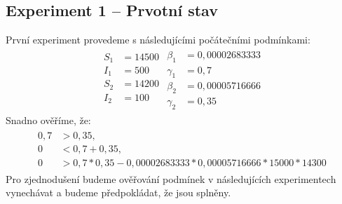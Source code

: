 \documentclass{article}
\begin{document}
\subsection{Experiment 1 -- Prvotní stav}
První experiment provedeme s následujícími počátečními podmínkami:
\begin{align}
\begin{split}
    S_1&=14500\\
    I_1&=500\\
    S_2&=14200\\
    I_2&=100\\
\end{split}
\begin{split}
    \beta_1&=0,00002683333\\
    \gamma_1&=0,7\\
    \beta_2&=0,00005716666\\
    \gamma_2&=0,35\nonumber
\end{split}
\end{align}
Snadno ověříme, že:
\begin{align}
\begin{split}
    0,7&>0,35,\\
    0&<0,7+0,35,\\
    0&>0,7*0,35-0,00002683333*0,00005716666*15000*14300\nonumber
\end{split}
\end{align}
Pro zjednodušení budeme ověřování podmínek v následujících experimentech vynechávat a budeme předpokládat, že jsou splněny.
\end{document}
